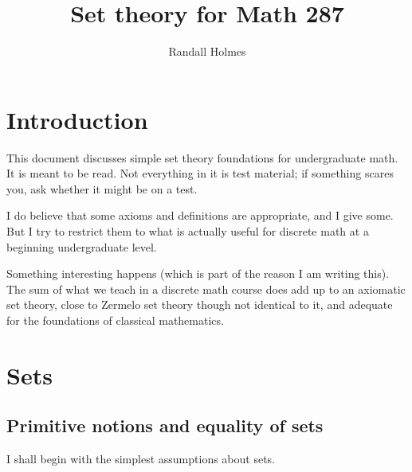 \documentclass[12pt]{article}
\title{Set theory for Math 287}
\author{Randall Holmes}
\begin{document}
\maketitle

\tableofcontents

\section{Introduction}

This document discusses simple set theory foundations for undergraduate math.  It is meant to be read.  Not everything in it is test material;  if something scares you, ask whether it might be on a test.

I do believe that some axioms and definitions are appropriate, and I give some.  But I try to restrict them to what is actually useful for discrete math at a beginning undergraduate level.

Something interesting happens (which is part of the reason I am writing this).  The sum of what we teach in a discrete math course does add up to an axiomatic set theory, close to Zermelo set theory though not identical to it, and adequate for the foundations of classical mathematics.



\newpage
\section{Sets}

\subsection{Primitive notions and equality of sets}

I shall begin with the simplest assumptions about sets.
\end{document}
